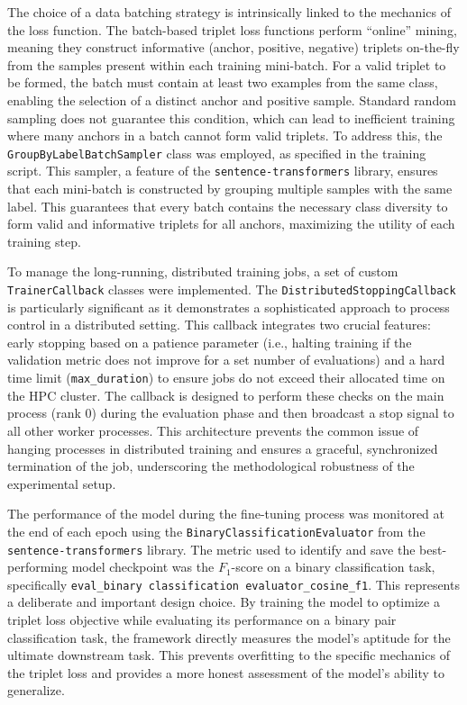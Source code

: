 The choice of a data batching strategy is intrinsically linked to the mechanics of the loss function. The batch-based triplet loss functions perform ``online'' mining, meaning they construct informative (anchor, positive, negative) triplets on-the-fly from the samples present within each training mini-batch. For a valid triplet to be formed, the batch must contain at least two examples from the same class, enabling the selection of a distinct anchor and positive sample. Standard random sampling does not guarantee this condition, which can lead to inefficient training where many anchors in a batch cannot form valid triplets. To address this, the \verb|GroupByLabelBatchSampler| class was employed, as specified in the training script. This sampler, a feature of the \verb|sentence-transformers| library, ensures that each mini-batch is constructed by grouping multiple samples with the same label. This guarantees that every batch contains the necessary class diversity to form valid and informative triplets for all anchors, maximizing the utility of each training step.  

To manage the long-running, distributed training jobs, a set of custom \verb|TrainerCallback| classes were implemented. The \verb|DistributedStoppingCallback| is particularly significant as it demonstrates a sophisticated approach to process control in a distributed setting. This callback integrates two crucial features: early stopping based on a patience parameter (i.e., halting training if the validation metric does not improve for a set number of evaluations) and a hard time limit (\verb|max_duration|) to ensure jobs do not exceed their allocated time on the HPC cluster. The callback is designed to perform these checks on the main process (rank 0) during the evaluation phase and then broadcast a stop signal to all other worker processes. This architecture prevents the common issue of hanging processes in distributed training and ensures a graceful, synchronized termination of the job, underscoring the methodological robustness of the experimental setup.

The performance of the model during the fine-tuning process was monitored at the end of each epoch using the \verb|BinaryClassificationEvaluator| from the \verb|sentence-transformers| library. The metric used to identify and save the best-performing model checkpoint was the \(F_1\)-score on a binary classification task, specifically \verb|eval_binary classification evaluator_cosine_f1|. This represents a deliberate and important design choice. By training the model to optimize a triplet loss objective while evaluating its performance on a binary pair classification task, the framework directly measures the model's aptitude for the ultimate downstream task. This prevents overfitting to the specific mechanics of the triplet loss and provides a more honest assessment of the model's ability to generalize.


